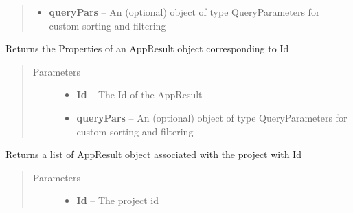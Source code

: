 \documentclass[letterpaper,10pt,english]{sphinxmanual}
\begin{document}
\begin{fulllineitems}
\begin{fulllineitems}
\begin{quote}
\begin{description}
\begin{itemize}
\item {} 
\textbf{queryPars} -- An (optional) object of type QueryParameters for custom sorting and filtering

\end{itemize}

\end{description}\end{quote}

\end{fulllineitems}


\begin{fulllineitems}
\label{Available modules:BaseSpacePy.api.BaseSpaceAPI.BaseSpaceAPI.getAppResultPropertiesById}
Returns the Properties of an AppResult object corresponding to Id
\begin{quote}\begin{description}
\item[{Parameters}] \leavevmode\begin{itemize}
\item {} 
\textbf{Id} -- The Id of the AppResult

\item {} 
\textbf{queryPars} -- An (optional) object of type QueryParameters for custom sorting and filtering

\end{itemize}

\end{description}\end{quote}

\end{fulllineitems}


\begin{fulllineitems}
\label{Available modules:BaseSpacePy.api.BaseSpaceAPI.BaseSpaceAPI.getAppResultsByProject}
Returns a list of AppResult object associated with the project with Id
\begin{quote}\begin{description}
\item[{Parameters}] \leavevmode\begin{itemize}
\item {} 
\textbf{Id} -- The project id


\end{itemize}
\end{description}
\end{quote}
\end{fulllineitems}
\end{fulllineitems}
\end{document}
